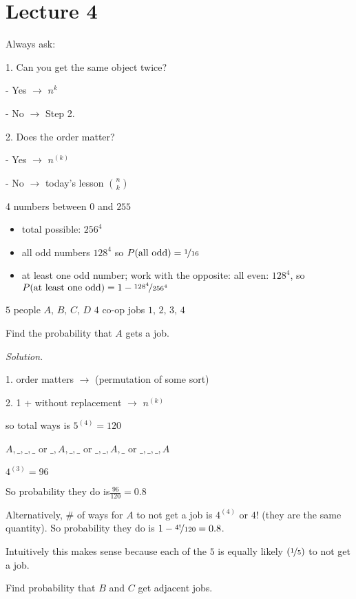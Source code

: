 \section{Lecture 4}
Always ask:

1. Can you get the same object twice?

- Yes $ \rightarrow $ $ n^k $

- No $ \rightarrow $ Step 2.

2. Does the order matter?

- Yes $ \rightarrow $ $ n^{(k)} $

- No $ \rightarrow $ today's lesson $ \binom{n}{k} $


4 numbers between $ 0 $ and $ 255 $
\begin{itemize}
    \item total possible: $256^4$
    \item all odd numbers $ 128^4 $ so $ P(\text{all odd})=\nicefrac{1}{16} $
    \item at least one odd number; work with the opposite: all even: $ 128^4 $,
    so $ P(\text{at least one odd})=1-\nicefrac{128^4}{256^4} $
\end{itemize}


$ 5 $ people $ A,\,B,\,C,\,D $ $ 4 $ co-op jobs $ 1,\,2,\,3,\,4 $

Find the probability that $ A $ gets a job.

\emph{Solution.}

1. order matters $ \rightarrow $ (permutation of some sort)

2. 1 + without replacement $ \rightarrow $ $ n^{(k)} $

so total ways is $ 5^{(4)}=120 $

$ A,\_,\_,\_ $ or $ \_,A,\_,\_ $ or $\_,\_,A,\_$ or $\_,\_,\_,A$ 

$ 4^{(3)}=96 $

So probability they do is$ \frac{96}{120} =0.8 $

Alternatively, \# of ways for $ A $ to not get a job is $ 4^{(4)} $ or $ 4! $
(they are the same quantity).
So probability they do is $ 1-\nicefrac{4!}{120}=0.8 $.

Intuitively this makes sense because each of the $ 5 $ is equally likely
$ (\nicefrac{1}{5}) $ to not get a job.

Find probability that $ B $ and $ C $ get adjacent jobs.

